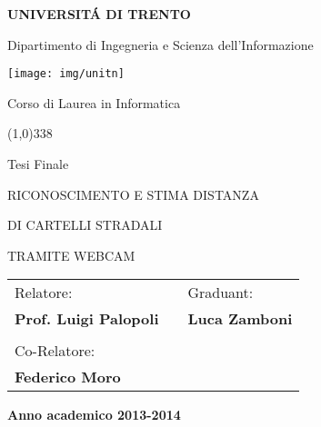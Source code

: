 
\pagestyle{empty}

\begin{center}
	{\bfseries\Large {\huge U}NIVERSIT\'A DI {\huge T}RENTO}

	\vspace{0.2cm}

	{\large Dipartimento di Ingegneria e Scienza dell'Informazione}

	\vspace{0.5cm}

	\begin{center}
		\texttt{[image: img/unitn]}
	\end{center}

	\vspace{0.5cm}

	{\Large Corso di Laurea in Informatica}

	\vspace{0.2cm}
	\line(1,0){338}
	\vspace{0.5cm}

	{\Large Tesi Finale}

	\vspace{1.5cm}

	{\Large {RICONOSCIMENTO E STIMA DISTANZA }}

	\vspace{0.2cm}

	{\Large {DI CARTELLI STRADALI}}

	\vspace{0.2cm}

	{\Large {TRAMITE WEBCAM}}

	\vspace{1.5cm}

	\large
	\begin{center}
		\begin{tabular}{lcl}
			Relatore: & \hspace{5cm} &  Graduant: \\
			{\bfseries Prof. Luigi Palopoli} & \hspace{5cm} & {\bfseries Luca Zamboni} \\ \\
			Co-Relatore: \\ {\bfseries Federico Moro}
		\end{tabular}
	\end{center}
	\vspace{2.0cm}

	{\large \bfseries Anno academico 2013-2014}
	\vfill

\end{center}
